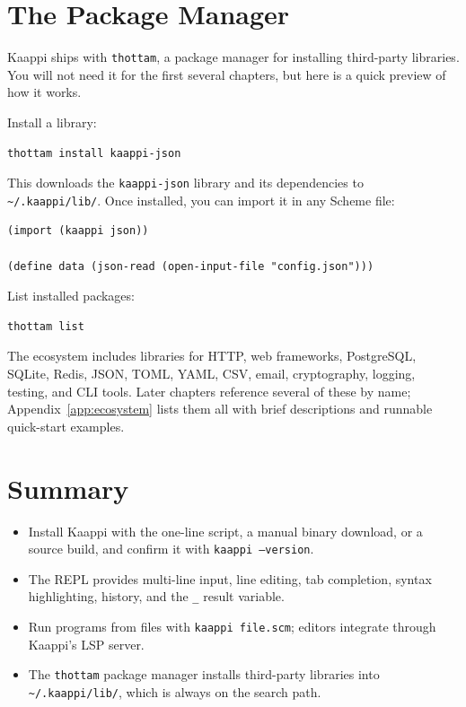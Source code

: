 \section{The Package Manager}

Kaappi ships with \texttt{thottam}, a package manager for installing third-party libraries. You will not need it for the first several chapters, but here is a quick preview of how it works.

Install a library:

\begin{Verbatim}[fontsize=\small]
thottam install kaappi-json
\end{Verbatim}

This downloads the \texttt{kaappi-json} library and its dependencies to \texttt{\textasciitilde/.kaappi/lib/}. Once installed, you can import it in any Scheme file:

\begin{lstlisting}
(import (kaappi json))

(define data (json-read (open-input-file "config.json")))
\end{lstlisting}

List installed packages:

\begin{Verbatim}[fontsize=\small]
thottam list
\end{Verbatim}

The ecosystem includes libraries for HTTP, web frameworks, PostgreSQL, SQLite, Redis, JSON, TOML, YAML, CSV, email, cryptography, logging, testing, and CLI tools. Later chapters reference several of these by name; Appendix~\ref{app:ecosystem} lists them all with brief descriptions and runnable quick-start examples.

\section*{Summary}

\begin{itemize}
    \item Install Kaappi with the one-line script, a manual binary download, or a source build, and confirm it with \texttt{kaappi --version}.
    \item The REPL provides multi-line input, line editing, tab completion, syntax highlighting, history, and the \texttt{\_} result variable.
    \item Run programs from files with \texttt{kaappi file.scm}; editors integrate through Kaappi's LSP server.
    \item The \texttt{thottam} package manager installs third-party libraries into \texttt{\textasciitilde/.kaappi/lib/}, which is always on the search path.
\end{itemize}

